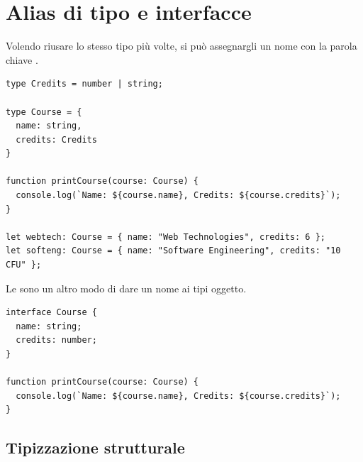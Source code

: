 \section{Alias di tipo e interfacce}

Volendo riusare lo stesso tipo più volte, si può assegnargli un nome con la
parola chiave .

\begin{affianco}[0.6][c]
\codicepiccolo
\begin{lstlisting}[style=ts, name=aliases.ts]
type Credits = number | string;

type Course = {
  name: string,
  credits: Credits
}

function printCourse(course: Course) {
  console.log(`Name: ${course.name}, Credits: ${course.credits}`);
}

let webtech: Course = { name: "Web Technologies", credits: 6 };
let softeng: Course = { name: "Software Engineering", credits: "10 CFU" };
\end{lstlisting}
\risultato
\begin{immagine}
\end{immagine}
\end{affianco}

Le  sono un altro modo di dare un nome ai tipi oggetto.

\begin{lstlisting}[style=ts, name=interfaces.ts]
interface Course {
  name: string;
  credits: number;
}

function printCourse(course: Course) {
  console.log(`Name: ${course.name}, Credits: ${course.credits}`);
}
\end{lstlisting}

\subsection{Tipizzazione strutturale}


